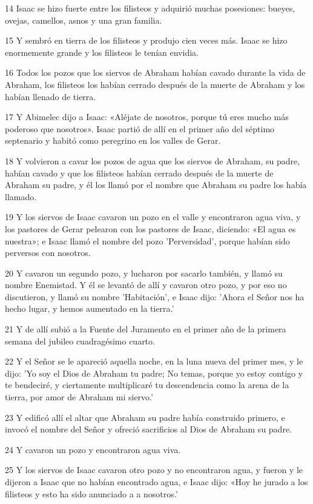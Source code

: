 \par 14 Isaac se hizo fuerte entre los filisteos y adquirió muchas posesiones: bueyes, ovejas, camellos, asnos y una gran familia.
\par 15 Y sembró en tierra de los filisteos y produjo cien veces más. Isaac se hizo enormemente grande y los filisteos le tenían envidia.
\par 16 Todos los pozos que los siervos de Abraham habían cavado durante la vida de Abraham, los filisteos los habían cerrado después de la muerte de Abraham y los habían llenado de tierra.
\par 17 Y Abimelec dijo a Isaac: «Aléjate de nosotros, porque tú eres mucho más poderoso que nosotros». Isaac partió de allí en el primer año del séptimo septenario y habitó como peregrino en los valles de Gerar.
\par 18 Y volvieron a cavar los pozos de agua que los siervos de Abraham, su padre, habían cavado y que los filisteos habían cerrado después de la muerte de Abraham su padre, y él los llamó por el nombre que Abraham su padre los había llamado.
\par 19 Y los siervos de Isaac cavaron un pozo en el valle y encontraron agua viva, y los pastores de Gerar pelearon con los pastores de Isaac, diciendo: «El agua es nuestra»; e Isaac llamó el nombre del pozo 'Perversidad', porque habían sido perversos con nosotros.
\par 20 Y cavaron un segundo pozo, y lucharon por sacarlo también, y llamó su nombre Enemistad. Y él se levantó de allí y cavaron otro pozo, y por eso no discutieron, y llamó su nombre 'Habitación', e Isaac dijo: 'Ahora el Señor nos ha hecho lugar, y hemos aumentado en la tierra.'
\par 21 Y de allí subió a la Fuente del Juramento en el primer año de la primera semana del jubileo cuadragésimo cuarto.
\par 22 Y el Señor se le apareció aquella noche, en la luna nueva del primer mes, y le dijo: 'Yo soy el Dios de Abraham tu padre; No temas, porque yo estoy contigo y te bendeciré, y ciertamente multiplicaré tu descendencia como la arena de la tierra, por amor de Abraham mi siervo.'
\par 23 Y edificó allí el altar que Abraham su padre había construido primero, e invocó el nombre del Señor y ofreció sacrificios al Dios de Abraham su padre.
\par 24 Y cavaron un pozo y encontraron agua viva.
\par 25 Y los siervos de Isaac cavaron otro pozo y no encontraron agua, y fueron y le dijeron a Isaac que no habían encontrado agua, e Isaac dijo: «Hoy he jurado a los filisteos y esto ha sido anunciado a a nosotros.'
